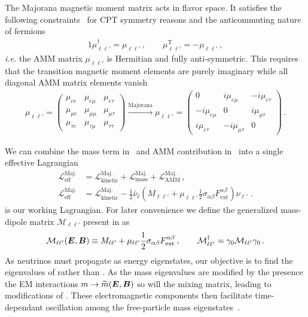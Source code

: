 The Majorana magnetic moment matrix acts in flavor space. It satisfies the following constraints~\citep{Giunti:2014ixa} for CPT symmetry reasons and the anticommuting nature of fermions
\begin{alignat}{1}
\label{props:1}
\mu_{\ell\ell'}^{\dag}=\mu_{\ell\ell'}\,,\qquad
\mu_{\ell\ell'}^\mathrm{T}=-\mu_{\ell\ell'}\,,
\end{alignat}
{\it i.e.\/} the AMM matrix $\mu_{\ell\ell'}$ is Hermitian and fully anti-symmetric. This requires that the transition magnetic moment elements are purely imaginary while all diagonal AMM matrix elements vanish
\begin{align}
\label{mu:1}
\mu_{\ell\ell'}=
\begin{pmatrix}
\mu_{ee} & \mu_{e\mu} & \mu_{e\tau} \\
\mu_{\mu e} & \mu_{\mu\mu} & \mu_{\mu\tau} \\
\mu_{\tau e} & \mu_{\tau\mu} & \mu_{\tau\tau}
\end{pmatrix}\xrightarrow{\mathrm{Majorana}}
\mu_{\ell\ell'}=
\begin{pmatrix}
0 & i\mu_{e\mu} & -i\mu_{e\tau} \\
-i\mu_{e\mu} & 0 & i\mu_{\mu\tau} \\
i\mu_{e\tau} & -i\mu_{\mu\tau} & 0
\end{pmatrix}\,.
\end{align}

We can combine the mass term in~ and AMM contribution in~ into a single effective Lagrangian
\begin{align}
\label{massmom:1}
\mathcal{L}_\mathrm{eff}^\mathrm{Maj.} &= \mathcal{L}_\mathrm{kinetic}^\mathrm{Maj.} + \mathcal{L}_\mathrm{mass}^\mathrm{Maj.} + \mathcal{L}_\mathrm{AMM}^\mathrm{Maj.}\,,\\
\label{massmom:2}
\mathcal{L}_\mathrm{eff}^\mathrm{Maj.} &= \mathcal{L}_\mathrm{kinetic}^\mathrm{Maj.} - \frac{1}{2}\bar\nu_{\ell}\left(M_{\ell\ell'}+\mu_{\ell\ell'}\frac{1}{2}\sigma_{\alpha\beta}F^{\alpha\beta}_\mathrm{ext}\right)\nu_{\ell'}\;.
\end{align}
 is our working Lagrangian. For later convenience we define the generalized mass-dipole matrix $\mathcal{M}_{\ell\ell'}$ present in  as
\begin{align}
\label{massmom:3}
\mathcal{M}_{\ell\ell'}(\boldsymbol{E},\boldsymbol{B})\equiv M_{\ell\ell'}+\mu_{\ell\ell'}\frac{1}{2}\sigma_{\alpha\beta}F^{\alpha\beta}_\mathrm{ext}\,,\qquad \mathcal{M}_{\ell\ell'}^{\dag}=\gamma_{0}\mathcal{M}_{\ell\ell'}\gamma_{0}\,.
\end{align}
As neutrinos must propagate as energy eigenstates, our objective is to find the eigenvalues of  rather than . As the mass eigenvalues are modified by the presence the EM interactions $m\rightarrow\widetilde m(\boldsymbol{E},\boldsymbol{B})$ so will the mixing matrix, leading to modifications of . These electromagnetic components then facilitate time-dependant oscillation among the free-particle mass eigenstates~\citep{Giunti:2014ixa}.

